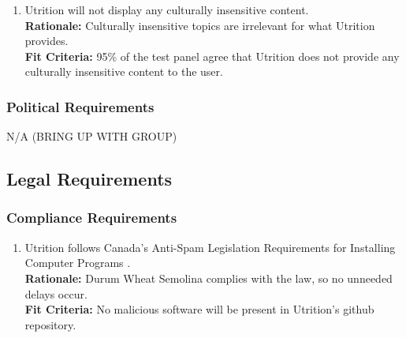 \documentclass[12pt]{article}
\begin{document}
\begin{enumerate}[{CP}1. ] 
	\item Utrition will not display any culturally insensitive content. \\
	\textbf{Rationale:} Culturally insensitive topics are irrelevant for what Utrition provides.\\	
	\textbf{Fit Criteria:} 95\% of the test panel agree that Utrition does not provide any culturally insensitive content to the user.
\end{enumerate}

\subsubsection{Political Requirements}
\hspace{1.5cm}N/A (BRING UP WITH GROUP) 

\subsection{Legal Requirements}
\subsubsection{Compliance Requirements}
\begin{enumerate}[{LR}1. ]
	\item Utrition follows Canada’s Anti-Spam Legislation Requirements for Installing Computer Programs \citep{CanadianInstall}.\\
	\textbf{Rationale:} Durum Wheat Semolina complies with the law, so no unneeded delays occur.\\
	\textbf{Fit Criteria:} No malicious software will be present in Utrition’s github repository.
\end{enumerate}
\end{document}
